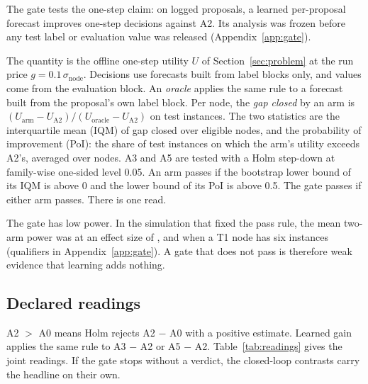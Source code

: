 The gate tests the one-step claim: on logged proposals, a learned per-proposal forecast improves one-step decisions against A2. Its analysis was frozen before any test label or evaluation value was released (Appendix~\ref{app:gate}).

The quantity is the offline one-step utility $U$ of Section~\ref{sec:problem} at the run price $g=0.1\,\sigma_{\mathrm{node}}$. Decisions use forecasts built from label blocks only, and values come from the evaluation block. An \emph{oracle} applies the same rule to a forecast built from the proposal's own label block. Per node, the \emph{gap closed} by an arm is $(U_{\mathrm{arm}}-U_{\mathrm{A2}})/(U_{\mathrm{oracle}}-U_{\mathrm{A2}})$ on test instances. The two statistics are the interquartile mean (IQM) of gap closed over eligible nodes, and the probability of improvement (PoI): the share of test instances on which the arm's utility exceeds A2's, averaged over nodes. A3 and A5 are tested with a Holm step-down at family-wise one-sided level 0.05. An arm passes if the bootstrap lower bound of its IQM is above 0 and the lower bound of its PoI is above 0.5. The gate passes if either arm passes. There is one read.

The gate has low power. In the simulation that fixed the pass rule, the mean two-arm power was \GatePowerMain{} at an effect size of \GatePowerEffect{}, and \GatePowerSmallTOne{} when a T1 node has six instances (qualifiers in Appendix~\ref{app:gate}). A gate that does not pass is therefore weak evidence that learning adds nothing.

\subsection{Declared readings}
\label{sec:setup-readings}
A2 $>$ A0 means Holm rejects A2 $-$ A0 with a positive estimate. Learned gain applies the same rule to A3 $-$ A2 or A5 $-$ A2. Table~\ref{tab:readings} gives the joint readings. If the gate stops without a verdict, the closed-loop contrasts carry the headline on their own.


